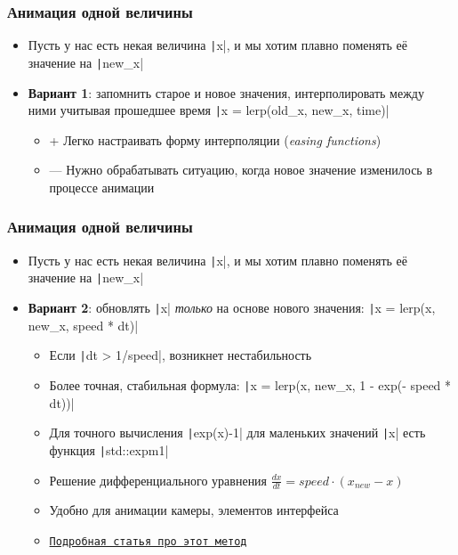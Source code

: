 \documentclass[10pt]{beamer}
\begin{document}
\begin{frame}[fragile]
\frametitle{Анимация одной величины}
\begin{itemize}
\item Пусть у нас есть некая величина \texttt|x|, и мы хотим плавно поменять её значение на \texttt|new_x|
\pause
\item \textbf{Вариант 1}: запомнить старое и новое значения, интерполировать между ними учитывая прошедшее время \texttt|x = lerp(old_x, new_x, time)|
\pause
\begin{itemize}
\item {\color{green}+} Легко настраивать форму интерполяции (\textit{easing functions})
\pause
\item {\color{red}---} Нужно обрабатывать ситуацию, когда новое значение изменилось в процессе анимации
\end{itemize}
\end{itemize}
\end{frame}

\begin{frame}[fragile]
\frametitle{Анимация одной величины}
\begin{itemize}
\item Пусть у нас есть некая величина \texttt|x|, и мы хотим плавно поменять её значение на \texttt|new_x|
\pause
\item \textbf{Вариант 2}: обновлять \texttt|x| \textit{только} на основе нового значения: \texttt|x = lerp(x, new_x, speed * dt)|
\begin{itemize}
\item Если \texttt|dt > 1/speed|, возникнет нестабильность
\pause
\item Более точная, стабильная формула: \texttt|x = lerp(x, new_x, 1 - exp(- speed * dt))|
\pause
\item Для точного вычисления \texttt|exp(x)-1| для маленьких значений \texttt|x| есть функция \texttt|std::expm1|
\pause
\item Решение дифференциального уравнения \begin{math}\frac{dx}{dt} = speed \cdot (x_{new} - x)\end{math}
\pause
\item Удобно для анимации камеры, элементов интерфейса
\pause
\item \href{https://lisyarus.github.io/blog/programming/2023/02/21/exponential-smoothing.html}{\texttt{Подробная статья про этот метод}}
\end{itemize}
\end{itemize}
\end{frame}
\end{document}
